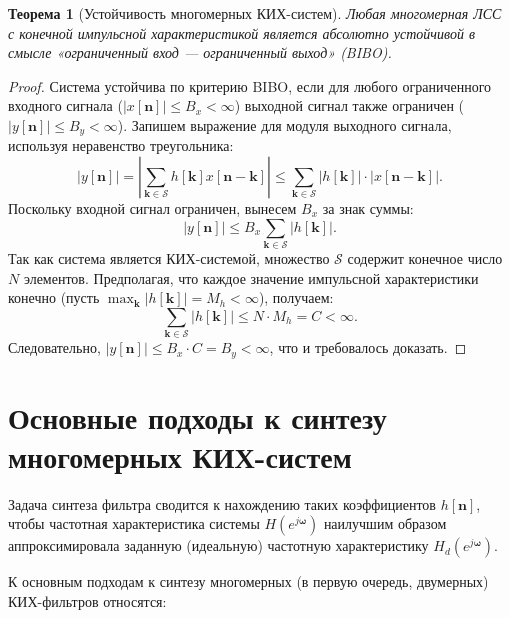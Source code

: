 \documentclass[12pt, a4paper]{article}
\theoremstyle{definition}
\theoremstyle{plain}
\newtheorem{theorem}{Теорема}
\begin{document}
\begin{theorem}[Устойчивость многомерных КИХ-систем]
Любая многомерная ЛСС с конечной импульсной характеристикой является абсолютно устойчивой в смысле «ограниченный вход — ограниченный выход» (BIBO).
\end{theorem}
\begin{proof}
Система устойчива по критерию BIBO, если для любого ограниченного входного сигнала ($|x[\mathbf{n}]| \leq B_x < \infty$) выходной сигнал также ограничен ($|y[\mathbf{n}]| \leq B_y < \infty$).
Запишем выражение для модуля выходного сигнала, используя неравенство треугольника:
\begin{equation}
    |y[\mathbf{n}]| = \left| \sum_{\mathbf{k} \in \mathcal{S}} h[\mathbf{k}] x[\mathbf{n} - \mathbf{k}] \right| \leq \sum_{\mathbf{k} \in \mathcal{S}} |h[\mathbf{k}]| \cdot |x[\mathbf{n} - \mathbf{k}]|.
\end{equation}
Поскольку входной сигнал ограничен, вынесем $B_x$ за знак суммы:
\begin{equation}
    |y[\mathbf{n}]| \leq B_x \sum_{\mathbf{k} \in \mathcal{S}} |h[\mathbf{k}]|.
\end{equation}
Так как система является КИХ-системой, множество $\mathcal{S}$ содержит конечное число $N$ элементов. Предполагая, что каждое значение импульсной характеристики конечно (пусть $\max_{\mathbf{k}} |h[\mathbf{k}]| = M_h < \infty$), получаем:
\begin{equation}
    \sum_{\mathbf{k} \in \mathcal{S}} |h[\mathbf{k}]| \leq N \cdot M_h = C < \infty.
\end{equation}
Следовательно, $|y[\mathbf{n}]| \leq B_x \cdot C = B_y < \infty$, что и требовалось доказать.
\end{proof}

\section{Основные подходы к синтезу многомерных КИХ-систем}

Задача синтеза фильтра сводится к нахождению таких коэффициентов $h[\mathbf{n}]$, чтобы частотная характеристика системы $H(e^{j\bm{\omega}})$ наилучшим образом аппроксимировала заданную (идеальную) частотную характеристику $H_d(e^{j\bm{\omega}})$.

К основным подходам к синтезу многомерных (в первую очередь, двумерных) КИХ-фильтров относятся:
\end{document}
